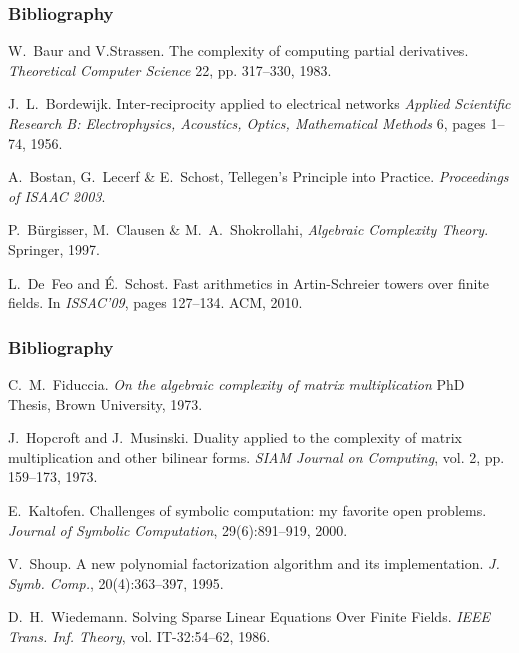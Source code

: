 \documentclass[10pt]{beamer}
\begin{document}

\begin{frame}
  \frametitle{Bibliography}

  \begin{thebibliography}{1}
    
    W.~Baur and V.Strassen.
    \newblock The complexity of computing partial derivatives.
    \newblock \emph{Theoretical Computer Science} 22, pp. 317--330, 1983.

    J.~L.~Bordewijk.
    \newblock Inter-reciprocity applied to electrical networks
    \newblock \emph{Applied Scientific Research B: Electrophysics, Acoustics, Optics, Mathematical Methods} 6, pages 1--74, 1956.

  A.~Bostan, G.~Lecerf \& E.~Schost,
    \newblock Tellegen's Principle into Practice.
    \newblock \emph{Proceedings of ISAAC 2003}.

  P.~Bürgisser, M.~Clausen \& M.~A.~Shokrollahi,
    \newblock \emph{Algebraic Complexity Theory}.
    \newblock Springer, 1997.

    L.~De~Feo and {\'E}.~Schost.
    \newblock Fast arithmetics in Artin-Schreier towers over finite fields. 
    \newblock In \emph{ISSAC'09}, pages 127--134. ACM, 2010.

  \end{thebibliography}
\end{frame}

\begin{frame}
  \frametitle{Bibliography}

  \begin{thebibliography}{1}
  
    C.~M.~Fiduccia.
    \newblock \emph{On the algebraic complexity of matrix multiplication}
    \newblock PhD Thesis, Brown University, 1973.

    J.~Hopcroft and J.~Musinski.
    \newblock Duality applied to the complexity of matrix multiplication
    and other bilinear forms.
    \newblock \emph{SIAM Journal on Computing}, vol. 2, pp. 159–173, 1973.

    E.~Kaltofen.
    \newblock Challenges of symbolic computation: my
    favorite open problems.
    \newblock \emph{Journal of Symbolic Computation}, 29(6):891--919, 2000.

    V.~Shoup.
    \newblock A new polynomial factorization algorithm and its implementation.
    \newblock \emph{J. Symb. Comp.}, 20(4):363--397, 1995.
    
    D.~H.~Wiedemann.
    \newblock Solving Sparse Linear Equations Over Finite Fields.
    \newblock \emph{IEEE Trans. Inf. Theory}, vol. IT-32:54--62, 1986.

  \end{thebibliography}
\end{frame}
\end{document}
